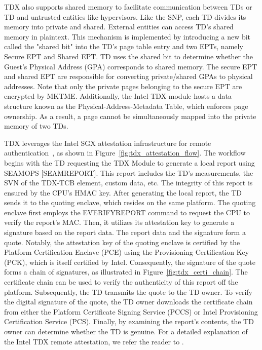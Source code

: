 TDX also supports shared memory to facilitate communication between TDs or TD and untrusted entities like hypervisors. Like the SNP, each TD divides its memory into private and shared. External entities can access TD's shared memory in plaintext. This mechanism is implemented by introducing a 
new bit called the "shared bit" into the TD's page table entry and two EPTs, namely Secure EPT and Shared EPT. TD uses the shared bit to determine whether the Guest's Physical Address (GPA) corresponds to shared memory. The secure EPT and shared EPT are responsible for converting private/shared 
GPAs to physical addresses. Note that only the private pages belonging to the secure EPT are encrypted by MKTME. Additionally, the Intel-TDX module hosts a data structure known as the Physical-Address-Metadata Table, which enforces page ownership. As a result, a page cannot be simultaneously 
mapped into the private memory of two TDs.


TDX leverages the Intel SGX attestation infrastructure for remote authentication~\cite*{Intel_tdx_whitepaper}, as shown in Figure~\ref{fig:tdx_attestation_flow}.
The workflow begins with the TD requesting the TDX Module to generate a local report using SEAMOPS [SEAMREPORT]. This report includes the TD's measurements, the SVN of the TDX-TCB element, custom data, etc. The integrity of this report is ensured by the CPU's HMAC key.
After generating the local report, the TD sends it to the quoting enclave,  which resides on the same platform. The quoting enclave first employs the EVERIFYREPORT command to request the CPU to verify the report's MAC. Then, it utilizes its attestation key to generate a signature based on the 
report data. The report data and the signature form a quote. Notably, the attestation key of the quoting enclave is certified by the Platform Certification Enclave (PCE) using the Provisioning Certification Key (PCK), which is itself certified by Intel.
Consequently, the signature of the quote forms a chain of signatures, as illustrated in Figure~\ref{fig:tdx_certi_chain}. The certificate chain can be used to verify the authenticity of this report off the platform. Subsequently, the TD transmits the quote to the TD owner. To verify the digital signature of the quote, 
the TD owner downloads the certificate chain from either the Platform Certificate Signing Service (PCCS) or Intel Provisioning Certification Service (PCS). Finally, by examining the report's contents, the TD owner can determine whether the TD is genuine.  For a detailed explanation of the Intel TDX remote attestation, we 
refer the reader to \cite*{Intel_tdx_whitepaper, 9448036, DBLP:journals/corr/abs-2303-15540}.

